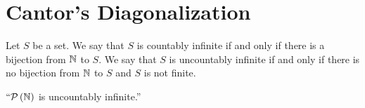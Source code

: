     \section{Cantor's Diagonalization}
        \begin{definition}
            Let $S$ be a set. We say that $S$ is countably infinite if and only if
            there is a bijection from $\mathbb{N}$ to $S$. We say that $S$ is uncountably
            infinite if and only if there is no bijection from $\mathbb{N}$ to $S$ and
            $S$ is not finite.
        \end{definition}
        \begin{theorem}
            $``\mathcal{P}\left(\mathbb{N}\right)$ is uncountably infinite.''
            \label{diagonalization}
        \end{theorem}
